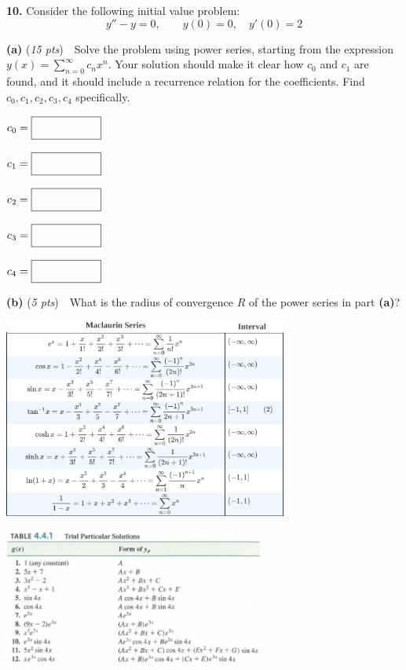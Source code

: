 \documentclass[11pt,reqno]{amsart}
\newcommand{\prob}[1]{\bigskip\noindent\textbf{#1.} }
\newcommand{\pts}[1]{(\emph{#1 pts})}
\newcommand{\epartpts}[2]{\medskip\noindent \textbf{(#1)} \pts{#2} \,\,}
\begin{document}
\newpage
\prob{10}  Consider the following initial value problem:
    $$y''-y=0, \qquad y(0)=0, \quad y'(0)=2$$

\epartpts{a}{15}  Solve the problem using power series, starting from the expression $\displaystyle y(x)=\sum_{n=0}^\infty c_n x^n$.  Your solution should make it clear how $c_0$ and $c_1$ are found, and it should include a recurrence relation for the coefficients.  Find $c_0,c_1,c_2,c_3,c_4$ specifically.
\vfill

\hfill $\begin{matrix}
c_0 = \fbox{\large \strut \hspace{20mm}} \\
\\ 
c_1 = \fbox{\large \strut \hspace{20mm}} \\ 
\\
c_2 = \fbox{\large \strut \hspace{20mm}} \\ 
\\
c_3 = \fbox{\large \strut \hspace{20mm}} \\
\\
c_4 = \fbox{\large \strut \hspace{20mm}} \end{matrix} $

\bigskip
\epartpts{b}{5}  What is the radius of convergence $R$ of the power series in part \textbf{(a)}?
\vspace{0.5in}


\newpage
\begin{center}
\scriptsize

\normalsize

\medskip
\includegraphics[width=0.7\textwidth]{figs/familiarseries}

\bigskip
\includegraphics[width=0.64\textwidth]{figs/yptable}
\end{center}
\end{document}
